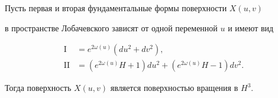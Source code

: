 \begin{lem}


Пусть первая и вторая фундаментальные формы поверхности $X(u,v)$


в пространстве Лобачевского зависят от одной переменной $u$ и имеют вид


\begin{align*}


\mathrm I&=e^{2 \omega (u)}(du^2+dv^2),\\


\mathrm{II}&=(e^{2 \omega (u)}H+1)du^2+(e^{2 \omega (u)}H-1)dv^2.


\end{align*}


Тогда поверхность $X(u,v)$ является поверхностью вращения в $H^3$.


\end{lem}





